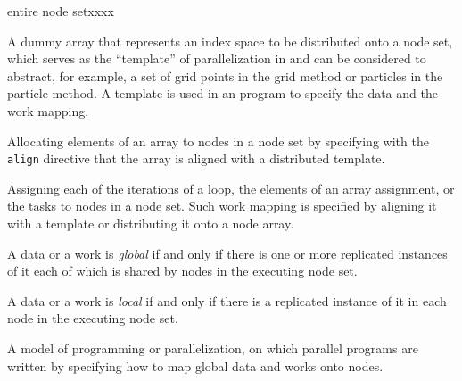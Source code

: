 \begin{namelist}{entire node setxxxx}

 A dummy array that represents an index space to be distributed onto a
 node set, which serves as the ``template'' of parallelization in
 {\XMP} and can be considered to abstract, for example, a set of grid
 points in the grid method or particles in the particle method.
%
 A template is used in an {\XMP} program to specify the data and the
 work mapping.



 Allocating elements of an array to nodes in a node set by specifying
 with the {\tt align} directive that the array is aligned with a
 distributed template.



 Assigning each of the iterations of a loop, the elements of an array
 assignment, or the tasks to nodes in a node set. Such work mapping is
 specified by aligning it with a template or distributing it onto a
 node array.

%


 A data or a work is {\it global} if and only if there is one or more
 replicated instances of it each of which is shared by nodes in the
 executing node set.


 A data or a work is {\it local} if and only if there is a replicated
 instance of it in each node in the executing node set.


 A model of programming or parallelization, on which parallel programs
 are written by specifying how to map global data and works onto nodes.


\end{namelist}
